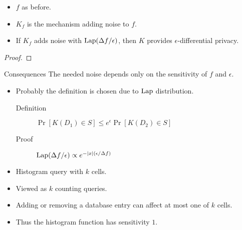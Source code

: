 \begin{frame}
  \begin{theorem}
    \begin{itemize}
      \item \(f\) as before.
      \item \(K_f\) is the mechanism adding noise to \(f\).

        \pause{}

      \item If \(K_f\) adds noise with \(\operatorname{Lap}(\Delta f/\epsilon)\),
        then \(K\) provides \(\epsilon\)-differential privacy.
    \end{itemize}
  \end{theorem}

  \pause{}

  \begin{proof}
  \end{proof}
\end{frame}

\begin{frame}
  \begin{block}{Consequences}
    The needed noise depends only on the sensitivity of \(f\) and \(\epsilon\).
  \end{block}

  \pause{}

  \begin{question}
    \begin{itemize}
      \item Probably the definition is chosen due to \(\operatorname{Lap}\) distribution.
        \begin{description}
          \item[Definition] \(\Pr[K(D_1)\in S] \leq e^\epsilon \Pr[K(D_2)\in 
              S]\)
          \item[Proof] \(\operatorname{Lap}(\Delta f/\epsilon)\propto e^{-|x|(\epsilon/\Delta
                f)}\)
        \end{description}
    \end{itemize}
  \end{question}
\end{frame}

\begin{frame}
  \begin{example}[Histograms]
    \begin{itemize}
      \item Histogram query with \(k\) cells.

        \pause{}

      \item Viewed as \(k\) counting queries.

        \pause{}

      \item Adding or removing a database entry can affect at most one of \(k\)
        cells.

        \pause{}

      \item Thus the histogram function has sensitivity \(1\).
    \end{itemize}
  \end{example}
\end{frame}



